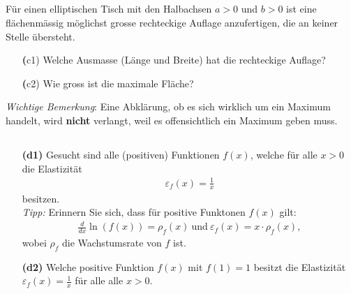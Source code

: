 \subsection*{}
Für einen elliptischen Tisch mit den Halbachsen $ a > 0  $ und $ b > 0 $ ist eine flächenmässig möglichst grosse rechteckige Auflage anzufertigen, die an keiner Stelle übersteht.
\begin{enumerate}
	\item[\textbf(c1)]
	Welche Ausmasse (Länge und Breite) hat die rechteckige Auflage?
	\item[\textbf(c2)]
	Wie gross ist die maximale Fläche?
\end{enumerate}
\textit{Wichtige Bemerkung}: Eine Abklärung, ob es sich wirklich um ein Maximum handelt, wird \textbf{nicht} verlangt, weil es offensichtlich ein Maximum geben muss.
\ \\
\subsection*{}
\begin{enumerate}
	\item[\textbf{(d1)}]
	Gesucht sind alle (positiven) Funktionen $ f(x) $, welche für alle $ x > 0 $ die Elastizität
	\begin{align*}
		\varepsilon_f(x) = \frac{1}{x}
	\end{align*}
	besitzen.\\
	\textit{Tipp:} Erinnern Sie sich, dass für positive Funktonen $ f(x) $ gilt:
	\begin{align*}
		\frac{d}{dx} \ln(f(x)) = \rho_f(x) 
		\ \textrm{und} \
		\varepsilon_f(x) = x \cdot \rho_f(x),
	\end{align*}
	wobei $ \rho_f $ die Wachstumsrate von $ f $ ist.
	\item[\textbf{(d2)}]
	Welche positive Funktion $ f(x) $ mit $ f(1) = 1 $ besitzt die Elastizität $ \varepsilon_f(x) = \frac{1}{x} $ für alle alle $ x >0 $.
\end{enumerate}
\newpage


